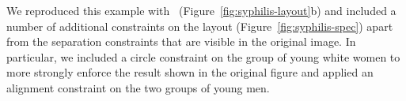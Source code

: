
We reproduced this example with \projectname~(Figure~\ref{fig:syphilis-layout}b) and included a number of additional constraints on the layout (Figure~\ref{fig:syphilis-spec}) apart from the separation constraints that are visible in the original image. In particular, we included a circle constraint on the group of young white women to more strongly enforce the result shown in the original figure and applied an alignment constraint on the two groups of young men. 

\subsection{}
